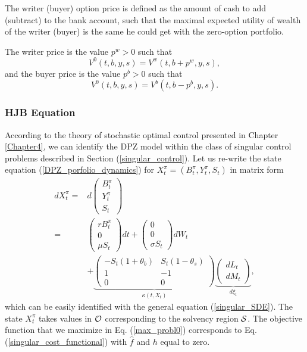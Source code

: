 The writer (buyer) option price is defined as the amount of cash to add (subtract) to the bank account, 
such that the maximal expected utility of wealth of the writer (buyer) is the same he could get with 
the zero-option portfolio.
\begin{Definition}
The writer price is the value $p^w>0$ such that 
 \begin{equation}\label{writer}
  V^0(t,b,y,s) = V^w(t,b+p^w,y,s),
 \end{equation}
 and the buyer price is the value $p^b>0$ such that
 \begin{equation}\label{buyer}
  V^0(t,b,y,s) = V^b(t,b-p^b,y,s).
 \end{equation}
\end{Definition}


\subsubsection{HJB Equation}\label{subsec_HJB}

According to the theory of stochastic optimal control presented in Chapter \ref{Chapter4},  
we can identify the DPZ model within the class of singular control problems described in Section (\ref{singular_control}).
Let us re-write the state equation (\ref{DPZ_porfolio_dynamics}) for $X^{\pi}_t = (B^{\pi}_t,Y^{\pi}_t,S_t)$ in matrix form 
\begin{align}\label{DPZ_porfolio_dynamicsM}
d X^{\pi}_t
=& 
 d \left(
\begin{array}{l}
B^{\pi}_t\\
Y^{\pi}_t\\
S_t
\end{array} \right) \\ \nonumber
  =&  \left( \begin{array}{l}
r B^{\pi}_t\\
0\\
\mu S_{t}
\end{array} \right)
dt +  \left( \begin{array}{l}
0\\
0\\
\sigma S_{t}
\end{array} \right) dW_t \\ \nonumber
&+ \underbrace{\left( \begin{array}{cc}
-S_{t}(1+\theta_b) & S_{t}(1-\theta_s) \\
1 & -1 \\
0 & 0
\end{array} \right)}_{\kappa(t,X_t)}
\underbrace{\left( \begin{array}{l}
dL_t \\
dM_t 
\end{array} \right)}_{d\xi_t},
\end{align}
which can be easily identified with the general equation (\ref{singular_SDE}).
The state $X^{\pi}_t$ takes values in $\mathcal{O}$ corresponding to the solvency region $\mathcal{S}$.
The objective function that we maximize in Eq. (\ref{max_probl0}) corresponds to Eq. (\ref{singular_cost_functional}) with $\hat f$ and $h$ equal to zero. 

